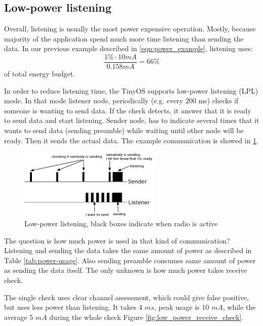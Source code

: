 \subsection{Low-power listening}

Overall, listening is usually the most power expensive operation.
Mostly, because majority of the application spend much more time listening than sending the data.
In our previous example described in \ref{eqn:power_example}, listening uses:
$$
\frac{1 \% \cdot 10 mA}{0.158 mA} = 66 \%
$$
of total energy budget.

In order to reduce listening time, the TinyOS supports low-power listening (LPL) mode.
In that mode listener node, periodically (e.g. every 200 ms) checks if someone is wanting to send data.
If the check detects, it answer that it is ready to send data and start listening.
Sender node, has to indicate several times that it wants to send data (sending preamble) while waiting until other node will be ready.
Then it sends the actual data.
The example communication is showed in \ref{fig:low_power_listening}.

\begin{figure}[h]
  \centering
  \includegraphics[width=0.6\textwidth]{diagrams/low_power_listening.eps}
  \caption{Low-power listening, black boxes indicate when radio is active}
  \label{fig:low_power_listening}
\end{figure}

The question is how much power is used in that kind of communication?
Listening and sending the data takes the same amount of power as described in Table \ref{tab:power-usage}.
Also sending preamble consumes same amount of power as sending the data itself.
The only unknown is how much power takes receive check.

The single check uses clear channel assessment, which could give false positive, but uses less power than listening.
It takes 4 $ ms $, peak usage is 10 $ mA $, while the average 5 $ mA $ during the whole check Figure \ref{fig:low_power_receive_check}.

